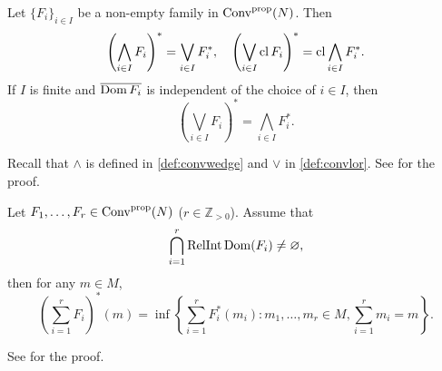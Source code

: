 \begin{proposition}\label{prop:Legendretranssup}
    Let $\{F_i\}_{i\in I}$ be a non-empty family in $\mathrm{Conv}^{\mathrm{prop}}(N)$. Then
    \[
    \left(\bigwedge_{i\in I} F_i\right)^*=\bigvee_{i\in I} F_i^*,\quad \left(\bigvee_{i\in I} \operatorname{cl} F_i\right)^*=\operatorname{cl} \bigwedge_{i\in I} F_i^*.
    \]
    If $I$ is finite and $\overline{\operatorname{Dom} F_i}$ is independent of the choice of $i\in I$, then
    \[
    \left(\bigvee_{i\in I} F_i\right)^*=\bigwedge_{i\in I} F_i^*.
    \]
\end{proposition}
Recall that $\wedge$ is defined in \cref{def:convwedge} and $\lor$ in \cref{def:convlor}. See \cite[Theorem~16.5]{Roc70} for the proof.

\begin{proposition}\label{prop:sumLegendre}
    Let $F_1,\ldots,F_r\in \mathrm{Conv}^{\mathrm{prop}}(N)$ ($r\in \mathbb{Z}_{>0}$). Assume that
    \[
        \bigcap_{i=1}^r\operatorname{RelInt} \operatorname{Dom}(F_i)\neq \varnothing,
    \]
    then for any $m\in M$,
    \[
    \left( \sum_{i=1}^r F_i \right)^*(m)=\inf\left\{\sum_{i=1}^r F_i^*(m_i):m_1,\ldots,m_r\in M, \sum_{i=1}^r m_i=m  \right\}.
    \]
\end{proposition}
See \cite[Theorem~16.4]{Roc70} for the proof.

